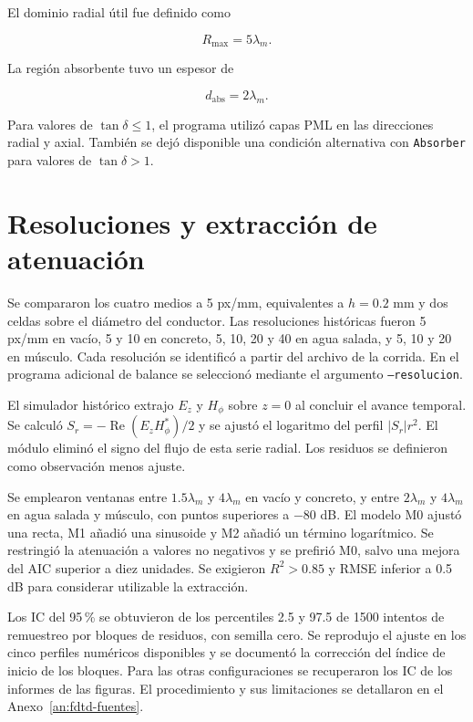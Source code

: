 El dominio radial útil fue definido como

\begin{equation}
R_{\max}=5\lambda_m.
\end{equation}

La región absorbente tuvo un espesor de

\begin{equation}
d_{\mathrm{abs}}=2\lambda_m.
\end{equation}

Para valores de $\tan\delta\leq1$, el programa utilizó capas PML en las direcciones radial y axial. También se dejó disponible una condición alternativa con \texttt{Absorber} para valores de $\tan\delta>1$.


\section{Resoluciones y extracción de atenuación}
Se compararon los cuatro medios a 5 px/mm, equivalentes a $h=0.2$ mm y dos celdas sobre el diámetro del conductor. Las resoluciones históricas fueron 5 px/mm en vacío, 5 y 10 en concreto, 5, 10, 20 y 40 en agua salada, y 5, 10 y 20 en músculo. Cada resolución se identificó a partir del archivo de la corrida. En el programa adicional de balance se seleccionó mediante el argumento \texttt{--resolucion}.

El simulador histórico extrajo $E_z$ y $H_\phi$ sobre $z=0$ al concluir el avance temporal. Se calculó $S_r=-\operatorname{Re}(E_zH_\phi^*)/2$ y se ajustó el logaritmo del perfil $|S_r|r^2$. El módulo eliminó el signo del flujo de esta serie radial. Los residuos se definieron como observación menos ajuste.

Se emplearon ventanas entre $1.5\lambda_m$ y $4\lambda_m$ en vacío y concreto, y entre $2\lambda_m$ y $4\lambda_m$ en agua salada y músculo, con puntos superiores a $-80$ dB. El modelo M0 ajustó una recta, M1 añadió una sinusoide y M2 añadió un término logarítmico. Se restringió la atenuación a valores no negativos y se prefirió M0, salvo una mejora del AIC superior a diez unidades. Se exigieron $R^2>0.85$ y RMSE inferior a 0.5 dB para considerar utilizable la extracción.

Los IC del 95\,\% se obtuvieron de los percentiles 2.5 y 97.5 de 1500 intentos de remuestreo por bloques de residuos, con semilla cero. Se reprodujo el ajuste en los cinco perfiles numéricos disponibles y se documentó la corrección del índice de inicio de los bloques. Para las otras configuraciones se recuperaron los IC de los informes de las figuras. El procedimiento y sus limitaciones se detallaron en el Anexo~\ref{an:fdtd-fuentes}.

